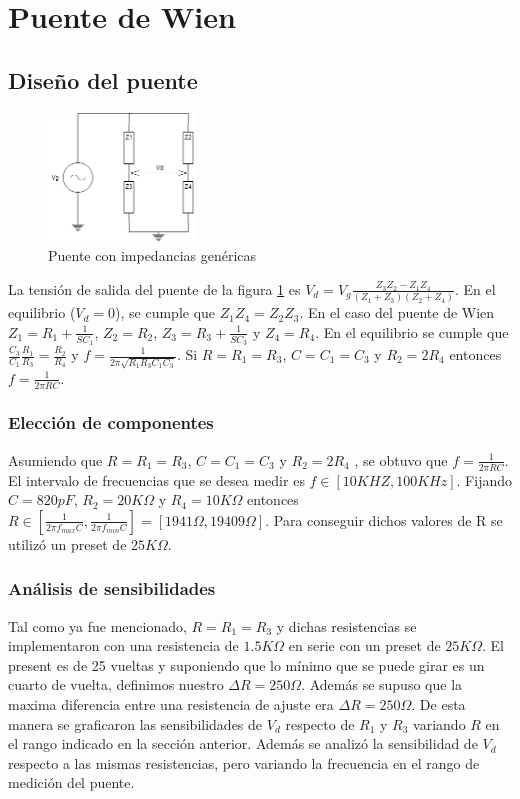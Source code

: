 \documentclass[../../main.tex]{subfiles}
\begin{document}
\section{Puente de Wien}

\subsection{Diseño del puente}
\begin{figure}[H]	
	\centering
	\includegraphics[width=0.35\textwidth]{fotos/PuenteGen.png}
	\caption{Puente con impedancias gen\'ericas} \label{fig:pg}
\end{figure}
La tensión de salida del puente de la figura \ref{fig:pg} es $V_d=V_g \frac{Z_3 Z_2 - Z_1 Z_4}{(Z_1 + Z_3)(Z_2 + Z_4)}$. En el equilibrio ($V_d=0$), se cumple que $Z_1 Z_4 = Z_2 Z_3$. En el caso del puente de Wien $Z_1=R_1 + \frac{1}{SC_1}$, $Z_2=R_2$, $Z_3=R_3 +  \frac{1}{SC_3}$ y $Z_4=R_4$. En el equilibrio se cumple que $\frac{C_3}{C_1} \frac{R_1}{R_3}= \frac {R_2}{R_4}$ y $f=\frac{1}{2 \pi \sqrt{R_1 R_3 C_1 C_3} }$. Si $R=R_1=R_3$, $C=C_1=C_3$ y $R_2=2 R_4$ entonces $f=\frac{1}{2 \pi RC}$.

\subsubsection{Elección de componentes}
Asumiendo que  $R=R_1=R_3$, $C=C_1=C_3$ y $R_2=2 R_4$ , se obtuvo que  $f=\frac{1}{2 \pi RC}$. El intervalo de frecuencias que se desea medir es $f \in [10KHZ , 100KHz]$. Fijando $C=820pF$, $R_2=20K\Omega$ y $R_4=10K\Omega$  entonces $R \in \left[ \frac{1}{2 \pi f_{max} C} , \frac{1}{2 \pi f_{min} C} \right]=\left[ 1941 \Omega , 19409 \Omega \right]$. Para conseguir dichos valores de R se utilizó un preset de $25K\Omega $.

\subsubsection{An\'alisis de sensibilidades}
Tal como ya fue mencionado, $R=R_1=R_3$ y dichas resistencias se implementaron con una resistencia de $1.5K\Omega$ en serie con un preset de $25K\Omega$. El present es de 25 vueltas y suponiendo que lo m\'inimo que se puede girar es un cuarto de vuelta, definimos nuestro $\Delta R=250\Omega$. Adem\'as se supuso que la maxima diferencia entre una resistencia de ajuste era $\Delta R=250\Omega$. De esta manera se graficaron las sensibilidades de $V_d$ respecto de $R_1$ y $R_3$ variando $R$ en el rango indicado en la secci\'on anterior. Adem\'as se analizó la sensibilidad de $V_d$ respecto a las mismas resistencias, pero variando la frecuencia en el rango de medición del puente.
\end{document}
